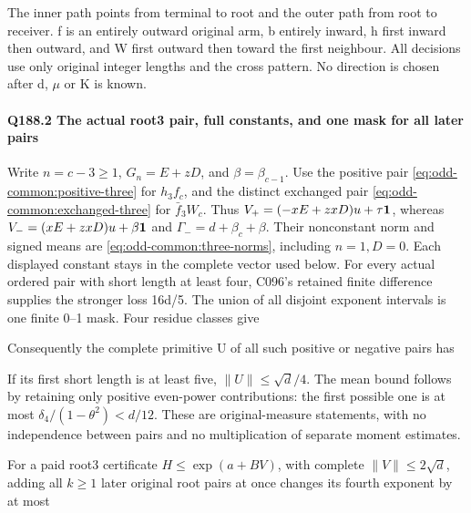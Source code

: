 The inner path points from terminal to root and the outer path from root to receiver. f is an entirely outward original arm, b entirely inward, h first inward then outward, and W first outward then toward the first neighbour. All decisions use only original integer lengths and the cross pattern. No direction is chosen after d, \(\mu\) or K is known.

\paragraph{Q188.2 The actual root3 pair, full constants, and one mask for all later pairs}\label{part:Q188.2}

Write \(n=c-3\ge1\), \(G_n=E+zD\), and
\(\beta=\beta_{c-1}\).
Use the positive pair \eqref{eq:odd-common:positive-three} for
\(h_3f_c\), and the distinct exchanged pair
\eqref{eq:odd-common:exchanged-three} for \(\bar f_3W_c\).
Thus \(V_+=(-xE+zxD)u+\tau\mathbf1\), whereas
\(V_-=(xE+zxD)u+\beta\mathbf1\) and
\(\Gamma_-=d+\beta_c+\beta\).
Their nonconstant norm and signed means are
\eqref{eq:odd-common:three-norms}, including \(n=1,D=0\).
Each displayed constant stays in the complete vector used below.
For every actual ordered pair with short length at least four, C096's retained finite difference supplies the stronger loss 16d/5. The union of all disjoint exponent intervals is one finite 0–1 mask. Four residue classes give



Consequently the complete primitive U of all such positive or negative pairs has



If its first short length is at least five, \(\|U\|\le \sqrt{d}/4\). The mean bound follows by retaining only positive even-power contributions: the first possible one is at most \(\delta_4/(1-\theta^2)<d/12\). These are original-measure statements, with no independence between pairs and no multiplication of separate moment estimates.

For a paid root3 certificate \(H\le \exp(a+BV)\), with complete \(\|V\|\le 2\sqrt{d}\), adding all \(k\ge 1\) later original root pairs at once changes its fourth exponent by at most

